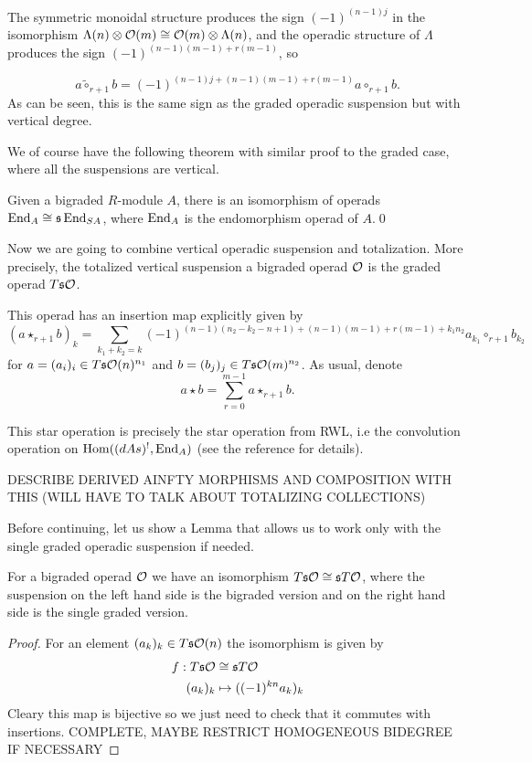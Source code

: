 \documentclass[twoside]{article}
\begin{document}
The symmetric monoidal structure produces the sign $(-1)^{(n-1)j}$ in the isomorphism $\Lambda(n)\otimes {\mathcal O}(m)\cong{\mathcal O}(m)\otimes\Lambda(n)$, and the operadic structure of $\Lambda$ produces the sign $(-1)^{(n-1)(m-1)+r(m-1)}$, so 

\begin{equation}\label{sign}
a\tilde{\circ}_{r+1}b=(-1)^{(n-1)j+(n-1)(m-1)+r(m-1)}a\circ_{r+1} b.
\end{equation}
As can be seen, this is the same sign as the graded operadic suspension but with vertical degree.

We of course have the following theorem with similar proof to the graded case, where all the suspensions are vertical.
\begin{thm}\label{markl}
Given a bigraded $R$-module $A$, there is an isomorphism of operads $\operatorname{End}_{ A}\cong \mathfrak{s}\operatorname{End}_{SA}$, where $\operatorname{End}_A$ is the endomorphism operad of $A$.\qed
\end{thm}

 

Now we are going to combine vertical operadic suspension and totalization. More precisely, the totalized vertical suspension a bigraded operad ${\mathcal O}$ is the graded operad $T\mathfrak{s}{\mathcal O}$. 


This operad has an insertion map explicitly given by
\[(a\star_{r+1} b)_k=\sum_{k_1+k_2=k}(-1)^{(n-1)(n_2-k_2-n+1)+(n-1)(m-1)+r(m-1)+k_1n_2}a_{k_1}\circ_{r+1}b_{k_2}\]
for $a=(a_i)_i\in T\mathfrak{s}{\mathcal O}(n)^{n_1}$ and $b=(b_j)_j\in T\mathfrak{s}{\mathcal O}(m)^{n_2}$. As usual, denote \[a\star b=\sum_{r=0}^{m-1}a\star_{r+1}b.\]

This star operation is precisely the star operation from RWL, i.e the convolution operation on $\operatorname{Hom}((dAs)^!, \operatorname{End}_A)$ (see the reference for details). 

DESCRIBE DERIVED AINFTY MORPHISMS AND COMPOSITION WITH THIS (WILL HAVE TO TALK ABOUT TOTALIZING COLLECTIONS)

Before continuing, let us show a Lemma that allows us to work only with the single graded operadic suspension if needed.
\begin{lemma}
For a bigraded operad ${\mathcal O}$ we have an isomorphism $T\mathfrak{s}{\mathcal O}\cong \mathfrak{s} T{\mathcal O}$, where the suspension on the left hand side is the bigraded version and on the right hand side is the single graded version. 
\end{lemma}
\begin{proof}
For an element $(a_k)_k\in T\mathfrak{s}{\mathcal O}(n)$ the isomorphism is given by
\begin{align*}
f:T\mathfrak{s}{\mathcal O}&\cong \mathfrak{s} T{\mathcal O}\\
(a_k)_k&\mapsto ((-1)^{kn}a_k)_k
\end{align*}
Cleary this map is bijective so we just need to check that it commutes with insertions. COMPLETE, MAYBE RESTRICT HOMOGENEOUS BIDEGREE IF NECESSARY
\end{proof}
\end{document}
